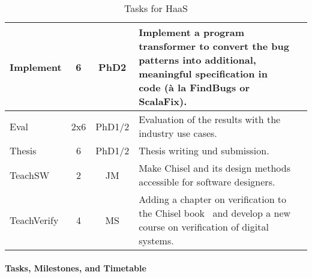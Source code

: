 \documentclass[fleqn,12pt]{article}
\begin{document}
\begin{table*}
{\begin{center}
\begin{tabular}{lccp{110mm}l}
      Implement              & 6   & PhD2      & Implement a program transformer to convert the bug patterns into %
  additional, meaningful  specification in code (\`a la FindBugs or ScalaFix).                                                                 \\
      \midrule 
      Eval                   & 2x6 & PhD1/2    & Evaluation of the results with the industry use cases.                                                     \\
      Thesis                 & 6   & PhD1/2    & Thesis writing und submission.                                                                \\
      \midrule
      TeachSW                 &  2  & JM            & Make Chisel and its design methods accessible for software designers. \\
      TeachVerify                & 4   & MS        & Adding a chapter on verification to the Chisel book~\cite{chisel:book} and develop a new course on verification of digital systems.                       \\
      \bottomrule
    \end{tabular}
  \end{center}
  \caption{Tasks for HaaS}\label{tab:packages}
}
\end{table*}





\paragraph*{Tasks, Milestones, and Timetable}
\end{document}
